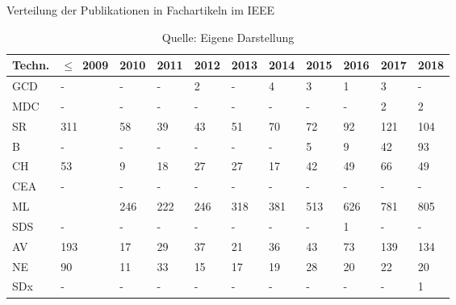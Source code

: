 \begin{table}
	\caption{Verteilung der Publikationen in Fachartikeln im \glqq IEEE\grqq}
	\selectfont
	\footnotesize
	\centering
	\label{tab:dist_ieee_art}
\begin{tabularx}{\linewidth}{XXXXXXXXXXX}
	\hline
	Techn. & $\leq$~2009 & 2010 & 2011 & 2012 & 2013 & 2014 & 2015 & 2016 & 2017 & 2018 \\
	\hline
	GCD & - & - & - & 2 & - & 4 & 3 & 1 & 3 & - \\
	MDC & - & - & - & - & - & - & - & - & 2 & 2 \\
	SR & 311 & 58 & 39 & 43 & 51 & 70 & 72 & 92 & 121 & 104 \\
	B & - & - & - & - & - & - & 5 & 9 & 42 & 93 \\
	CH & 53 & 9 & 18 & 27 & 27 & 17 & 42 & 49 & 66 & 49 \\
	CEA & - & - & - & - & - & - & - & - & - & - \\
	ML & \numprint{1551} & 246 & 222 & 246 & 318 & 381 & 513 & 626 & 781 & 805 \\
	SDS & - & - & - & - & - & - & - & 1 & - & - \\
	AV & 193 & 17 & 29 & 37 & 21 & 36 & 43 & 73 & 139 & 134 \\
	NE & 90 & 11 & 33 & 15 & 17 & 19 & 28 & 20 & 22 & 20 \\
	SDx & - & - & - & - & - & - & - & - & - & 1 \\
	\hline
\end{tabularx}
\caption*{Quelle: Eigene Darstellung}
\end{table}

